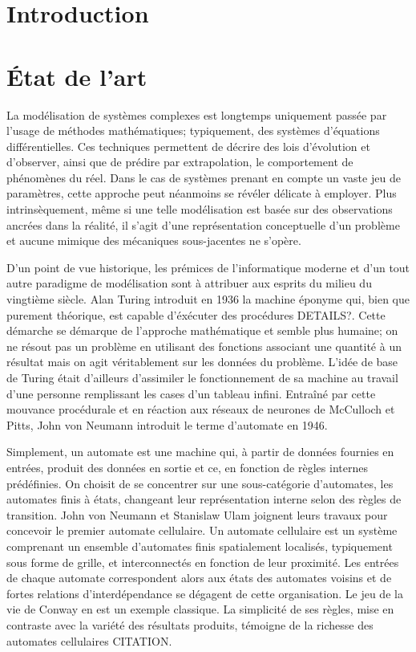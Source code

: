 \documentclass[10pt]{article}
\begin{document}
\begin{multicols}{2}

\section{Introduction}

\section{\'Etat de l'art}

La modélisation de systèmes complexes est longtemps uniquement passée
par l'usage de méthodes mathématiques; typiquement, des systèmes
d'équations différentielles. Ces techniques permettent de décrire des
lois d'évolution et d'observer, ainsi que de prédire par
extrapolation, le comportement de phénomènes du réel. Dans le cas de
systèmes prenant en compte un vaste jeu de paramètres, cette approche
peut néanmoins se révéler délicate à employer. Plus intrinsèquement,
même si une telle modélisation est basée sur des observations ancrées
dans la réalité, il s'agit d'une représentation conceptuelle d'un
problème et aucune mimique des mécaniques sous-jacentes ne s'opère.

D'un point de vue historique, les prémices de l'informatique moderne
et d'un tout autre paradigme de modélisation sont à attribuer aux
esprits du milieu du vingtième siècle. Alan Turing introduit en 1936
la machine éponyme qui, bien que purement théorique, est capable
d'éxécuter des procédures DETAILS?. Cette démarche se démarque de
l'approche mathématique et semble plus humaine; on ne résout pas un
problème en utilisant des fonctions associant une quantité à un
résultat mais on agit véritablement sur les données du
problème. L'idée de base de Turing était d'ailleurs d'assimiler le
fonctionnement de sa machine au travail d'une personne remplissant les
cases d'un tableau infini. Entraîné par cette mouvance procédurale et
en réaction aux réseaux de neurones de McCulloch et Pitts, John von
Neumann introduit le terme d'automate en 1946.

Simplement, un automate est une machine qui, à partir de données
fournies en entrées, produit des données en sortie et ce, en fonction
de règles internes prédéfinies. On choisit de se concentrer sur une
sous-catégorie d'automates, les automates finis à états, changeant
leur représentation interne selon des règles de transition. John von
Neumann et Stanislaw Ulam joignent leurs travaux pour concevoir le
premier automate cellulaire. Un automate cellulaire est un système
comprenant un ensemble d'automates finis spatialement localisés,
typiquement sous forme de grille, et interconnectés en fonction de
leur proximité. Les entrées de chaque automate correspondent alors aux
états des automates voisins et de fortes relations d'interdépendance
se dégagent de cette organisation. Le jeu de la vie de Conway en est
un exemple classique. La simplicité de ses règles, mise en contraste
avec la variété des résultats produits, témoigne de la richesse des
automates cellulaires CITATION.


\end{multicols}
\end{document}
